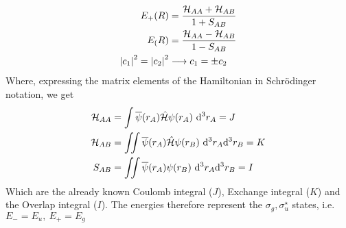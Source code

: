 \documentclass[../qm.tex]{subfiles}
\begin{document}
	\begin{equation}
		\begin{aligned}
			E_+(R)&=\frac{\mathcal{H}_{AA}+\mathcal{H}_{AB}}{1+S_{AB}}\\
			E_(R)&=\frac{\mathcal{H}_{AA}-\mathcal{H}_{AB}}{1-S_{AB}}\\
			\abs{c_1}^2=\abs{c_2}^2&\longrightarrow c_1=\pm c_2
		\end{aligned}
		\label{eq:egeradeungeradevarlcao}
	\end{equation}
	Where, expressing the matrix elements of the Hamiltonian in Schrödinger notation, we get
	\begin{equation}
		\begin{aligned}
			\mathcal{H}_{AA}&=\int\cc{\psi}(r_A)\opr{\ham}\psi(r_A)\diff[3]{r_A}=J\\
			\mathcal{H}_{AB}&=\iint\cc{\psi}(r_A)\opr{\ham}\psi(r_B)\ddiff[3]{r_A}{r_B}=K\\
			S_{AB}&=\iint\cc{\psi}(r_A)\psi(r_B)\ddiff[3]{r_A}{r_B}=I
		\end{aligned}
		\label{eq:integralsmatrixelementsvarlcao}
	\end{equation}
	Which are the already known Coulomb integral ($J$), Exchange integral ($K$) and the Overlap integral ($I$). The energies therefore represent the $\sigma_g,\sigma_u^{\star}$ states, i.e. $E_-=E_u,\ E_+=E_g$
\end{document}
